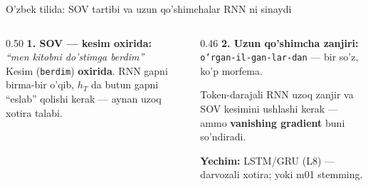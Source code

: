 \documentclass[aspectratio=169,11pt]{beamer}
\begin{document}
\begin{frame}{O'zbek tilida: SOV tartibi va uzun qo'shimchalar RNN ni sinaydi}
  \begin{columns}[T]
    \begin{column}{0.50\textwidth}
      \textbf{1. SOV --- kesim oxirida:}\\[3pt]
      \small
      \textit{``men kitobni do'stimga berdim''}\\[3pt]
      Kesim (\texttt{berdim}) \textbf{oxirida}. RNN gapni birma-bir o'qib, $h_T$ da
      butun gapni ``eslab'' qolishi kerak --- aynan uzoq xotira talabi.
    \end{column}
    \begin{column}{0.46\textwidth}
      \textbf{2. Uzun qo'shimcha zanjiri:}\\[3pt]
      \small
      \texttt{o'rgan-il-gan-lar-dan} --- bir so'z, ko'p morfema.\\[4pt]
      \begin{tcolorbox}[warnbox,title=Oqibat,top=2pt,bottom=2pt]
        \footnotesize
        Token-darajali RNN uzoq zanjir va SOV kesimini ushlashi kerak --- ammo
        \textbf{vanishing gradient} buni so'ndiradi.
      \end{tcolorbox}
      \vspace{2pt}
      \footnotesize\textbf{Yechim:} LSTM/GRU (L8) --- darvozali xotira; yoki m01 stemming.
    \end{column}
  \end{columns}
\end{frame}
\end{document}

